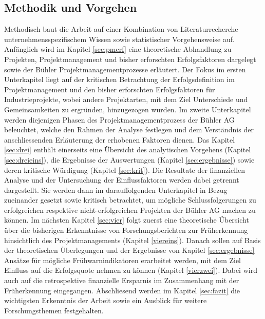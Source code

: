 \subsection{Methodik und Vorgehen}
Methodisch baut die Arbeit auf einer Kombination von Literaturrecherche unternehmensspezifischem Wissen sowie statistischer Vorgehensweise auf.
\newline
Anfänglich wird im Kapitel \ref{sec:pmerf} eine theoretische Abhandlung zu Projekten, Projektmanagement und bisher erforschten Erfolgsfaktoren dargelegt sowie der Bühler Projektmanagementprozesse erläutert. Der Fokus im ersten Unterkapitel liegt auf der kritischen Betrachtung der Erfolgsdefinition im Projektmanagement und den bisher erforschten Erfolgsfaktoren für Industrieprojekte, wobei andere Projektarten, mit dem Ziel Unterschiede und Gemeinsamkeiten zu ergründen, hinzugezogen wurden. Im zweite Unterkapitel werden diejenigen Phasen des Projektmanagementprozess der Bühler AG beleuchtet, welche den Rahmen der Analyse festlegen und dem Verständnis der anschliessenden Erläuterung der erhobenen Faktoren dienen.
\newline
Das Kapitel \ref{sec:drei} enthält einerseits eine Übersicht des analytischen Vorgehens (Kapitel \ref{sec:dreieins}), die Ergebnisse der Auswertungen (Kapitel \ref{sec:ergebnisse}) sowie deren kritische Würdigung (Kapitel \ref{sec:krit}). Die Resultate der finanziellen Analyse und der Untersuchung der Einflussfaktoren werden dabei getrennt dargestellt. Sie werden dann im darauffolgenden Unterkapitel in Bezug zueinander gesetzt sowie kritisch betrachtet, um mögliche Schlussfolgerungen zu erfolgreichen respektive nicht-erfolgreichen Projekten der Bühler AG machen zu können.
\newline
Im nächsten Kapitel \ref{sec:vier} folgt zuerst eine theoretische Übersicht über die bisherigen Erkenntnisse von Forschungsberichten zur Früherkennung hinsichtlich des Projektmanagements (Kapitel \ref{viereins}). Danach sollen auf Basis der theoretischen Überlegungen und der Ergebnisse von Kapitel \ref{sec:ergebnisse} Ansätze für mögliche Frühwarnindikatoren erarbeitet werden, mit dem Ziel Einfluss auf die Erfolgsquote nehmen zu können (Kapitel \ref{vierzwei}). Dabei wird auch auf die retrospektive finanzielle Ersparnis im Zusammenhang mit der Früherkennung eingegangen.
\newline
Abschliesend werden im Kapitel \ref{sec:fazit} die wichtigsten Erkenntnis der Arbeit sowie ein Ausblick für weitere Forschungsthemen festgehalten.

	




